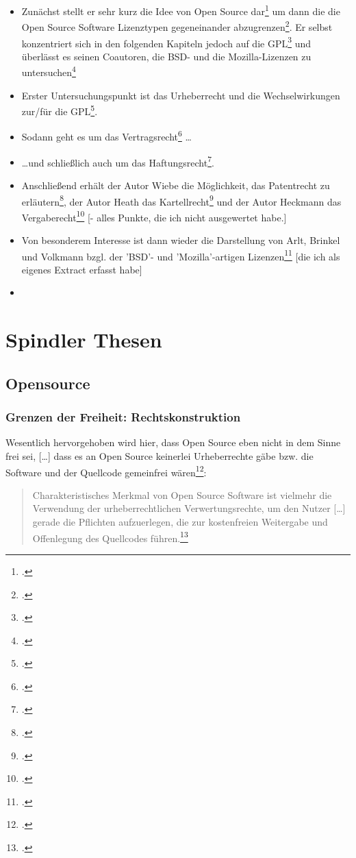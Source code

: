 \documentclass[DIV=calc,BCOR=5mm,11pt,headings=small,oneside,abstract=true, toc=bib]{scrartcl}
\begin{document}
\begin{itemize}
  \item Zunächst stellt er sehr kurz die Idee von Open Source
  dar\footcite[vgl.][1ff]{Spindler2004a} um dann die die \glqq{}Open Source
  Software Lizenztypen\grqq{} gegeneinander
  \glqq{}abzugrenzen\grqq{}\footcite[vgl.][9ff]{Spindler2004a}. Er selbst
  konzentriert sich in den folgenden Kapiteln jedoch auf die
  GPL\footcite[vgl.][21ff]{Spindler2004a} und überlässt es seinen Coautoren, die
  BSD- und die Mozilla-Lizenzen zu
  untersuchen\footcite[vgl.][317ff]{Spindler2004a}
  \item Erster Untersuchungspunkt ist das Urheberrecht und die Wechselwirkungen
  zur/für die GPL\footcite[vgl.][21ff]{Spindler2004a}.
  \item Sodann geht es um das Vertragsrecht\footcite[vgl.][151ff]{Spindler2004a}
  \ldots
  \item \ldots und schließlich auch um das
  Haftungsrecht\footcite[vgl.][151ff]{Spindler2004a}.
  \item Anschließend erhält der Autor Wiebe die Möglichkeit, das Patentrecht zu
  erläutern\footcite[vgl.][223ff]{Spindler2004a}, der Autor Heath das
  Kartellrecht\footcite[vgl.][267]{Spindler2004a} und der Autor Heckmann das
  Vergaberecht\footcite[vgl.][281ff]{Spindler2004a} [- alles Punkte, die ich
  nicht ausgewertet habe.]
  \item Von besonderem Interesse ist dann wieder die Darstellung von Arlt,
  Brinkel und Volkmann bzgl. der \glqq{}'BSD'- und 'Mozilla'-artigen
  Lizenzen\grqq{}\footcite[vgl.][317ff]{Spindler2004a} [die ich als eigenes
  Extract erfasst habe]
  \item 
\end{itemize}


\section{Spindler Thesen}

\subsection{Opensource}

\subsubsection{Grenzen der Freiheit: Rechtskonstruktion}

Wesentlich hervorgehoben wird hier, dass Open Source eben nicht in dem Sinne
frei sei, \glqq{}[\ldots] dass es an Open Source keinerlei Urheberrechte
gäbe bzw. die Software und der Quellcode gemeinfrei
wären\grqq{}\footcite[vgl.][2]{Spindler2004a}:
\begin{quote}\glqq{}Charakteristisches Merkmal von Open Source Software
ist vielmehr die Verwendung der urheberrechtlichen Verwertungsrechte, um
den Nutzer [\ldots] gerade die Pflichten aufzuerlegen, die zur
kostenfreien Weitergabe und Offenlegung des Quellcodes
führen.\grqq{}\footcite[][2]{Spindler2004a}
\end{quote}
\end{document}
